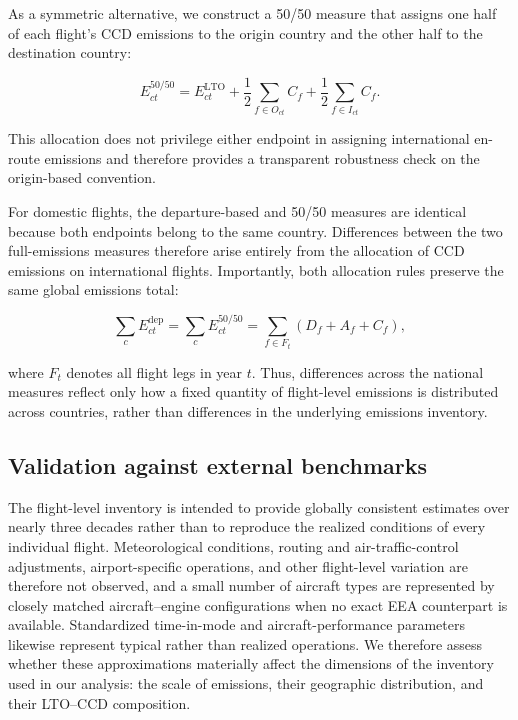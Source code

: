 \documentclass[12pt]{extarticle}
\begin{document}
As a symmetric alternative, we construct a 50/50 measure that assigns one half of each flight's CCD emissions to the origin country and the other half to the destination country:

\begin{equation}
E^{50/50}_{ct}
=
E^{\mathrm{LTO}}_{ct}
+
\frac{1}{2}\sum_{f\in O_{ct}} C_f
+
\frac{1}{2}\sum_{f\in I_{ct}} C_f .
\label{eq:nature_7}
\end{equation}

This allocation does not privilege either endpoint in assigning international en-route emissions and therefore provides a transparent robustness check on the origin-based convention.

For domestic flights, the departure-based and 50/50 measures are identical because both endpoints belong to the same country. Differences between the two full-emissions measures therefore arise entirely from the allocation of CCD emissions on international flights. Importantly, both allocation rules preserve the same global emissions total:

\begin{equation}
\sum_c E^{\mathrm{dep}}_{ct}
=
\sum_c E^{50/50}_{ct}
=
\sum_{f\in F_t}
\left(D_f+A_f+C_f\right),
\label{eq:nature_8}
\end{equation}

where $F_t$ denotes all flight legs in year $t$. Thus, differences across the national measures reflect only how a fixed quantity of flight-level emissions is distributed across countries, rather than differences in the underlying emissions inventory.

\subsection*{Validation against external benchmarks}

The flight-level inventory is intended to provide globally consistent estimates over nearly three decades rather than to reproduce the realized conditions of every individual flight. Meteorological conditions, routing and air-traffic-control adjustments, airport-specific operations, and other flight-level variation are therefore not observed, and a small number of aircraft types are represented by closely matched aircraft--engine configurations when no exact EEA counterpart is available. Standardized time-in-mode and aircraft-performance parameters likewise represent typical rather than realized operations. We therefore assess whether these approximations materially affect the dimensions of the inventory used in our analysis: the scale of emissions, their geographic distribution, and their LTO--CCD composition.
\end{document}
